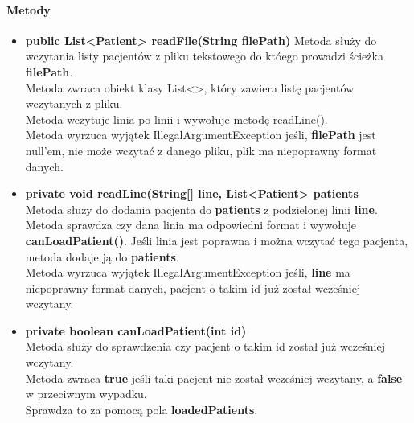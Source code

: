 \documentclass[]{article}
\begin{document}
                \paragraph{Metody}
                    \begin{itemize}
                        \item \textbf{public List<Patient> readFile(String filePath)}
                            Metoda służy do wczytania listy pacjentów z pliku tekstowego do któego prowadzi ścieżka \textbf{filePath}.\\
                            Metoda zwraca obiekt klasy List<>, który zawiera listę pacjentów wczytanych z pliku.\\
                            Metoda wczytuje linia po linii i wywołuje metodę readLine().\\
                            Metoda wyrzuca wyjątek IllegalArgumentException jeśli,
                                \textbf{filePath} jest null'em,
                                nie może wczytać z danego pliku,
                                plik ma niepoprawny format danych.
                        
                        \item \textbf{private void readLine(String[] line, List<Patient> patients}\\
                            Metoda służy do dodania pacjenta do \textbf{patients} z podzielonej linii \textbf{line}.
                            Metoda sprawdza czy dana linia ma odpowiedni format i wywołuje \textbf{canLoadPatient()}.
                            Jeśli linia jest poprawna i można wczytać tego pacjenta, metoda dodaje ją do \textbf{patients}.\\
                            Metoda wyrzuca wyjątek IllegalArgumentException jeśli,
                                \textbf{line} ma niepoprawny format danych,
                                pacjent o takim id już został wcześniej wczytany.
                                
                        \item \textbf{private boolean canLoadPatient(int id)}\\
                            Metoda służy do sprawdzenia czy pacjent o takim id został już wcześniej wczytany.\\
                            Metoda zwraca \textbf{true} jeśli taki pacjent nie został wcześniej wczytany,
                            a \textbf{false} w przeciwnym wypadku.\\
                            Sprawdza to za pomocą pola \textbf{loadedPatients}.\\
                    \end{itemize}
\end{document}
